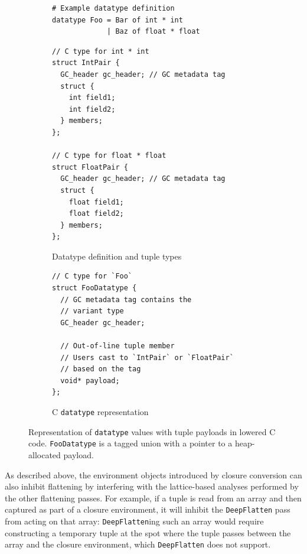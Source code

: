 \begin{figure}[!htb]
  \centering
  \begin{subfigure}[t]{0.48\textwidth}
    \caption{Datatype definition and tuple types}
    \label{fig:datatype_tuple_payload_types}
    \vspace{1mm}
\begin{verbatim}
# Example datatype definition
datatype Foo = Bar of int * int
             | Baz of float * float
\end{verbatim}
\vspace{1mm}
\begin{verbatim}
// C type for int * int
struct IntPair {
  GC_header gc_header; // GC metadata tag
  struct {
    int field1;
    int field2;
  } members;
};

// C type for float * float
struct FloatPair {
  GC_header gc_header; // GC metadata tag
  struct {
    float field1;
    float field2;
  } members;
};
\end{verbatim}
  \end{subfigure}\hfill
  \begin{subfigure}[t]{0.48\textwidth}
    \caption{C \texttt{datatype} representation}
    \label{fig:datatype_tuple_payload_c}
    \vspace{1mm}
\begin{verbatim}
// C type for `Foo`
struct FooDatatype {
  // GC metadata tag contains the
  // variant type
  GC_header gc_header;

  // Out-of-line tuple member
  // Users cast to `IntPair` or `FloatPair`
  // based on the tag
  void* payload;
};
\end{verbatim}
  \end{subfigure}

  \caption{Representation of \texttt{datatype} values with tuple payloads in lowered C code.
    \texttt{FooDatatype} is a tagged union with a pointer to a heap-allocated payload.}

  \label{fig:datatype_tuple_payload}
\end{figure}
\FloatBarrier


As described above, the environment objects introduced by closure conversion can
also inhibit flattening by interfering with the lattice-based analyses performed
by the other flattening passes. For example, if a tuple is read from an array
and then captured as part of a closure environment, it will inhibit the
\texttt{DeepFlatten} pass from acting on that array: \texttt{DeepFlatten}ing
such an array would require constructing a temporary tuple at the spot where the
tuple passes between the array and the closure environment, which
\texttt{DeepFlatten} does not support.

